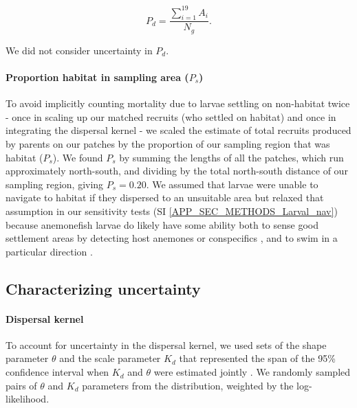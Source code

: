 \documentclass[12pt, oneside]{article}   	%
\begin{document}
\begin{equation}
P_d = \frac{\sum_{i=1}^{19} A_i}{N_g}. \label{EQN_DK_area_within_sampling_region}
\end{equation}

We did not consider uncertainty in $P_d$.

\paragraph*{Proportion habitat in sampling area ($P_s$)} %

To avoid implicitly counting mortality due to larvae settling on non-habitat twice - once in scaling up our matched recruits (who settled on habitat) and once in integrating the dispersal kernel - we scaled the estimate of total recruits produced by parents on our patches by the proportion of our sampling region that was habitat ($P_s$). We found $P_s$ by summing the lengths of all the patches, which run approximately north-south, and dividing by the total north-south distance of our sampling region, giving $P_s = 0.20$. We assumed that larvae were unable to navigate to habitat if they dispersed to an unsuitable area but relaxed that assumption in our sensitivity tests (SI \ref{APP_SEC_METHODS_Larval_nav}) because anemonefish larvae do likely have some ability both to sense good settlement areas by detecting host anemones \citep{elliott1995host, arvedlund1999host} or conspecifics \citep[e.g.,][for coral reef fish more broadly]{lecchini2005experimental}, and to swim in a particular direction \citep[e.g.,][]{bellwood2001relative, fisher2005swimming}. 

\subsection{Characterizing uncertainty} \label{APP_SEC_Uncertainty}

\paragraph*{Dispersal kernel} %

To account for uncertainty in the dispersal kernel, we used sets of the shape parameter $\theta$ and the scale parameter $K_d$ that represented the span of the 95\% confidence interval when $K_d$ and $\theta$ were estimated jointly \citep[Table \ref{APP_TAB_Params}, Fig.\ \ref{FIG_ParameterInputs}a,][]{catalanoInPrepconnectivity}. We randomly sampled pairs of $\theta$ and $K_d$ parameters from the distribution, weighted by the log-likelihood.
\end{document}
